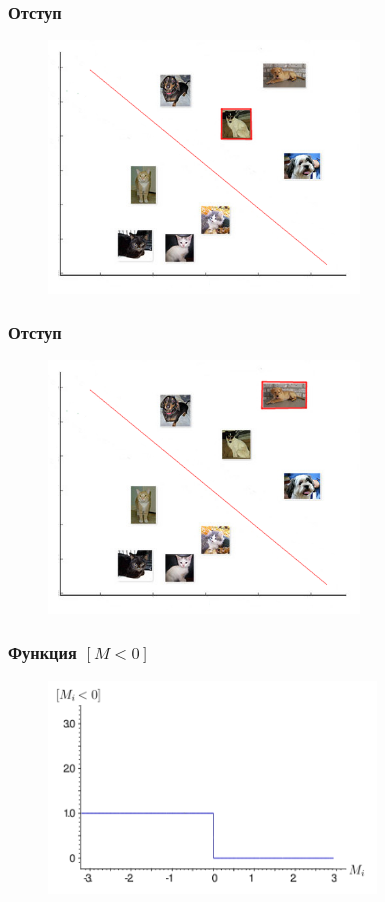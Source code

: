 \documentclass[10pt]{beamer}
\begin{document}
\begin{frame}\frametitle{Отступ}
	\begin{figure}[htbp]
	  \includegraphics[height=190pt, keepaspectratio = true]{images/margin1}
	\end{figure}
\end{frame}

\begin{frame}\frametitle{Отступ}
	\begin{figure}[htbp]
	  \includegraphics[height=190pt, keepaspectratio = true]{images/margin2}
	\end{figure}
\end{frame}

\begin{frame}\frametitle{Функция $[M<0]$}
	\begin{figure}[htbp]
	  \includegraphics[height=160pt, keepaspectratio = true]{images/l1}
	\end{figure}
\end{frame}
\end{document}
